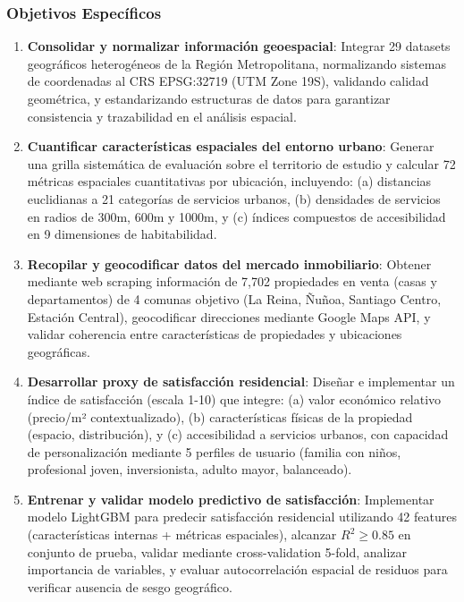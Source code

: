 \subsubsection{Objetivos Específicos}

\begin{enumerate}
    \item \textbf{Consolidar y normalizar información geoespacial}: Integrar 29 datasets geográficos heterogéneos de la Región Metropolitana, normalizando sistemas de coordenadas al CRS EPSG:32719 (UTM Zone 19S), validando calidad geométrica, y estandarizando estructuras de datos para garantizar consistencia y trazabilidad en el análisis espacial.
    
    \item \textbf{Cuantificar características espaciales del entorno urbano}: Generar una grilla sistemática de evaluación sobre el territorio de estudio y calcular 72 métricas espaciales cuantitativas por ubicación, incluyendo: (a) distancias euclidianas a 21 categorías de servicios urbanos, (b) densidades de servicios en radios de 300m, 600m y 1000m, y (c) índices compuestos de accesibilidad en 9 dimensiones de habitabilidad.
    
    \item \textbf{Recopilar y geocodificar datos del mercado inmobiliario}: Obtener mediante web scraping información de 7,702 propiedades en venta (casas y departamentos) de 4 comunas objetivo (La Reina, Ñuñoa, Santiago Centro, Estación Central), geocodificar direcciones mediante Google Maps API, y validar coherencia entre características de propiedades y ubicaciones geográficas.
    
    \item \textbf{Desarrollar proxy de satisfacción residencial}: Diseñar e implementar un índice de satisfacción (escala 1-10) que integre: (a) valor económico relativo (precio/m² contextualizado), (b) características físicas de la propiedad (espacio, distribución), y (c) accesibilidad a servicios urbanos, con capacidad de personalización mediante 5 perfiles de usuario (familia con niños, profesional joven, inversionista, adulto mayor, balanceado).
    
    \item \textbf{Entrenar y validar modelo predictivo de satisfacción}: Implementar modelo LightGBM para predecir satisfacción residencial utilizando 42 features (características internas + métricas espaciales), alcanzar $R^2 \geq 0.85$ en conjunto de prueba, validar mediante cross-validation 5-fold, analizar importancia de variables, y evaluar autocorrelación espacial de residuos para verificar ausencia de sesgo geográfico.


\end{enumerate}
